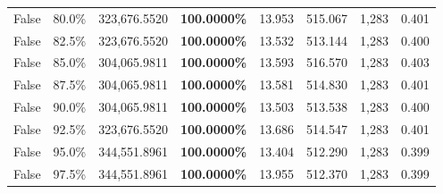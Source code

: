 \begin{table}[H]
\begin{tabular}{lllrllll}
\cline{1-8}
False & 80.0\% & 323,676.5520 & \bfseries \color{red} 100.0000\% & 13.953 & 515.067 & 1,283 & 0.401 \\
\cline{1-8}
False & 82.5\% & 323,676.5520 & \bfseries \color{red} 100.0000\% & 13.532 & 513.144 & 1,283 & 0.400 \\
\cline{1-8}
False & 85.0\% & 304,065.9811 & \bfseries \color{red} 100.0000\% & 13.593 & 516.570 & 1,283 & 0.403 \\
\cline{1-8}
False & 87.5\% & 304,065.9811 & \bfseries \color{red} 100.0000\% & 13.581 & 514.830 & 1,283 & 0.401 \\
\cline{1-8}
False & 90.0\% & 304,065.9811 & \bfseries \color{red} 100.0000\% & 13.503 & 513.538 & 1,283 & 0.400 \\
\cline{1-8}
False & 92.5\% & 323,676.5520 & \bfseries \color{red} 100.0000\% & 13.686 & 514.547 & 1,283 & 0.401 \\
\cline{1-8}
False & 95.0\% & 344,551.8961 & \bfseries \color{red} 100.0000\% & 13.404 & 512.290 & 1,283 & 0.399 \\
\cline{1-8}
False & 97.5\% & 344,551.8961 & \bfseries \color{red} 100.0000\% & 13.955 & 512.370 & 1,283 & 0.399 \\
\cline{1-8}
\bottomrule
\end{tabular}
\end{table}
